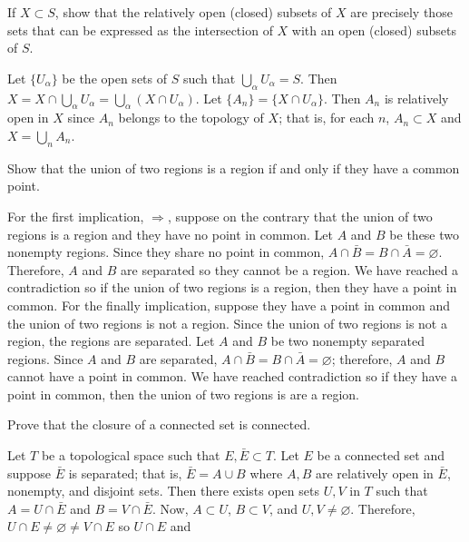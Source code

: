 \begin{exercise}[ref = \arabic{exercisei}]
\item
  If \(X\subset S\), show that the relatively open (closed) subsets of \(X\)
  are precisely those sets that can be expressed as the intersection of \(X\)
  with an open (closed) subsets of \(S\).
  \par\smallskip
  Let \(\{U_{\alpha}\}\) be the open sets of \(S\) such that
  \(\bigcup_{\alpha}U_{\alpha} = S\).
  Then
  \(X = X\cap\bigcup_{\alpha}U_{\alpha} = \bigcup_{\alpha}(X\cap U_{\alpha})\).
  Let \(\{A_n\} = \{X\cap U_{\alpha}\}\).
  Then \(A_n\) is relatively open in \(X\) since \(A_n\) belongs to the
  topology of \(X\); that is, for each \(n\), \(A_n\subset X\) and
  \(X = \bigcup_nA_n\).
\item
  Show that the union of two regions is a region if and only if they have a
  common point.
  \par\smallskip
  For the first implication, \(\Rightarrow\), suppose on the contrary that the
  union of two regions is a region and they have no point in common.
  Let \(A\) and \(B\) be these two nonempty regions.
  Since they share no point in common,
  \(A\cap\bar{B} = B\cap\bar{A} = \varnothing\).
  Therefore, \(A\) and \(B\) are separated so they cannot be a region.
  We have reached a contradiction so if the union of two regions is a region,
  then they have a point in common.
  For the finally implication, suppose they have a point in common and the
  union of two regions is not a region.
  Since the union of two regions is not a region, the regions are separated.
  Let \(A\) and \(B\) be two nonempty separated regions.
  Since \(A\) and \(B\) are separated,
  \(A\cap\bar{B} = B\cap\bar{A} = \varnothing\); therefore, \(A\) and \(B\)
  cannot have a point in common.
  We have reached contradiction so if they have a point in common, then the
  union of two regions is are a region.
\item
  \label{3.1.3.3}
  Prove that the closure of a connected set is connected.
  \par\smallskip
  Let \(T\) be a topological space such that \(E,\bar{E}\subset T\).
  Let \(E\) be a connected set and suppose \(\bar{E}\) is separated; that is,
  \(\bar{E} = A\cup B\) where \(A,B\) are relatively open in \(\bar{E}\),
  nonempty, and disjoint sets.
  Then there exists open sets \(U,V\) in \(T\) such that \(A = U\cap\bar{E}\)
  and \(B = V\cap\bar{E}\).
  Now, \(A\subset U\), \(B\subset V\), and \(U,V\neq\varnothing\).
  Therefore, \(U\cap E\neq\varnothing\neq V\cap E\) so \(U\cap E\) and

\end{exercise}
